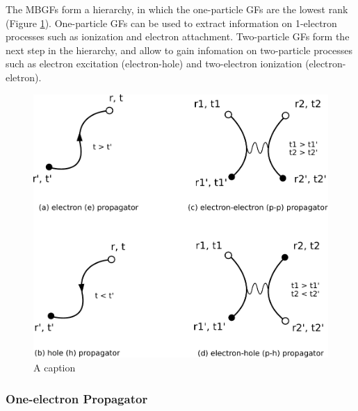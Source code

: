 The MBGFs form a hierarchy, in which the one-particle GFs are the lowest rank (Figure \ref{fig:PROP}). One-particle GFs can be used to extract information on 1-electron processes such as ionization and electron attachment. Two-particle GFs form the next step in the hierarchy, and allow to gain infomation on two-particle processes such as electron excitation (electron-hole) and two-electron ionization (electron-eletron). 
\begin{figure}
\centering
\includegraphics[scale=0.6]{Pics/PROP}
\caption{A caption}
\label{fig:PROP}
\end{figure}

\subsubsection{One-electron Propagator}

